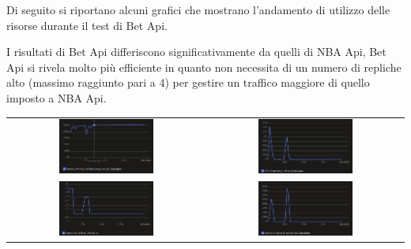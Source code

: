 Di seguito si riportano alcuni grafici che mostrano l'andamento di utilizzo delle risorse durante il test di Bet Api.

I risultati di Bet Api differiscono significativamente da quelli di NBA Api, Bet Api si rivela molto più efficiente in quanto non necessita di un numero di repliche alto (massimo raggiunto pari a 4) per gestire un traffico maggiore di quello imposto a NBA Api.

\begin{tabular}{ c c }
    \includegraphics[width=0.5\textwidth]{img/load_test/bet-api-mem-avg.png} & \includegraphics[width=0.5\textwidth]{img/load_test/bet-api-cpu-avg.png} \\
    \includegraphics[width=0.5\textwidth]{img/load_test/bet-api-rep-count.png} & \includegraphics[width=0.5\textwidth]{img/load_test/bet-api-rx-sum.png} \\
\end{tabular}


